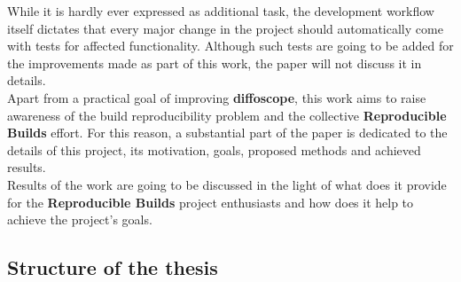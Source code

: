 {While it is hardly ever expressed as additional task, the development workflow
itself dictates that every major change in the project should automatically come 
with tests for affected functionality. Although such tests are going to be added
for the improvements made as part of this work, the paper will not discuss it in 
details.\\
Apart from a practical goal of improving \textbf{diffoscope}, this work aims
to raise awareness of the build reproducibility problem and the collective
\textbf{Reproducible Builds} effort. For this reason, a substantial part of
the paper is dedicated to the details of this project, its motivation, goals,
proposed methods and achieved results.\\
Results of the work are going to be discussed in the light of what does it
provide for the \textbf{Reproducible Builds} project enthusiasts and how does
it help to achieve the project's goals.
}

\subsection[Structure of the thesis]{Structure of the thesis}



